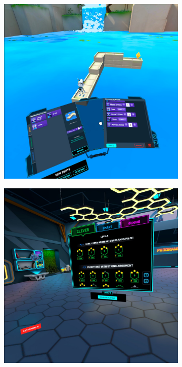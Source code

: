 \documentclass[a4paper,12pt]{article}
\begin{document}
\begin{figure}[H]
\begin{subfigure}[b]{0.49\textwidth}
    \end{subfigure}
    \begin{subfigure}[b]{0.49\textwidth}
        \centering
        \includegraphics[width=\textwidth]{screen3.jpg}
    \end{subfigure}
    \begin{subfigure}[b]{0.49\textwidth}
        \centering
        \includegraphics[width=\textwidth]{screen4.jpg}
    \end{subfigure}
\end{figure}
\end{document}
